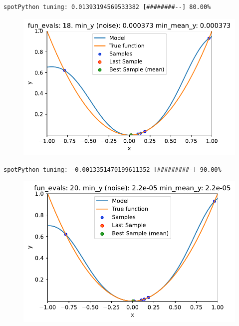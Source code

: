 \documentclass[
  letterpaper,
  DIV=11,
  numbers=noendperiod]{scrreprt}
\begin{document}
\begin{verbatim}
spotPython tuning: 0.01393194569533382 [########--] 80.00% 
\end{verbatim}

\begin{figure}[H]

{\centering \includegraphics{013_num_spot_noisy_files/figure-pdf/cell-10-output-12.pdf}

}

\end{figure}

\begin{verbatim}
spotPython tuning: -0.0013351470199611352 [#########-] 90.00% 
\end{verbatim}

\begin{figure}[H]

{\centering \includegraphics{013_num_spot_noisy_files/figure-pdf/cell-10-output-14.pdf}

}

\end{figure}
\end{document}
